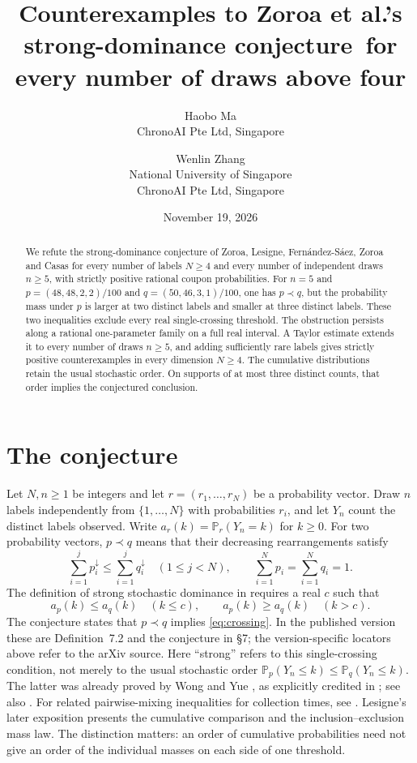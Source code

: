 \documentclass[11pt,a4paper]{article}
\title{Counterexamples to Zoroa et al.'s strong-dominance conjecture\ for every number of draws above four}
\author{Haobo Ma\\\small ChronoAI Pte Ltd, Singapore
\and Wenlin Zhang\\\small National University of Singapore\\\small ChronoAI Pte Ltd, Singapore}
\date{November 19, 2026}
\newcommand{\Prob}{\mathbb P}
\begin{document}
\maketitle
\begin{abstract}
We refute the strong-dominance conjecture of Zoroa, Lesigne,
Fern\'andez-S\'aez, Zoroa and Casas \cite[\S8, Conjecture, p.~30,
arXiv:1608.00155v1]{zoroa} for every number of labels $N\geq4$ and every
number of independent draws $n\geq5$, with strictly positive rational
coupon probabilities. For $n=5$ and
$p=(48,48,2,2)/100$ and $q=(50,46,3,1)/100$, one has $p\prec q$, but the
probability mass under $p$ is larger at two distinct labels and smaller at
three distinct labels. These two inequalities exclude every real
single-crossing threshold. The obstruction persists along a rational
one-parameter family on a full real interval. A Taylor estimate extends it
to every number of draws $n\geq5$, and adding sufficiently rare labels
gives strictly positive counterexamples in every dimension $N\geq4$.
The cumulative distributions retain the usual stochastic order. On
supports of at most three distinct counts, that order implies the
conjectured conclusion.
\end{abstract}

\section{The conjecture}
Let $N,n\geq1$ be integers and let $r=(r_1,\ldots,r_N)$ be a probability
vector. Draw $n$ labels independently from $\{1,\ldots,N\}$ with
probabilities $r_i$, and let $Y_n$ count the distinct labels observed.
Write $a_r(k)=\Prob_r(Y_n=k)$ for $k\geq0$.
For two probability vectors, $p\prec q$ means that their decreasing
rearrangements satisfy
\[
 \sum_{i=1}^j p_i^{\downarrow}\leq\sum_{i=1}^j q_i^{\downarrow}
 \quad(1\leq j<N),\qquad
 \sum_{i=1}^N p_i=\sum_{i=1}^N q_i=1.
\]
The definition of strong stochastic dominance in
\cite[Definition~8.2, pp.~28, 30]{zoroa} requires a real $c$ such that
\begin{equation}\label{eq:crossing}
 a_p(k)\leq a_q(k)\quad(k\leq c),\qquad
 a_p(k)\geq a_q(k)\quad(k>c).
\end{equation}
The conjecture states that $p\prec q$ implies \eqref{eq:crossing}.
In the published version these are Definition~7.2 and the conjecture
in \S7; the version-specific locators above refer to the arXiv source.
Here ``strong'' refers to this single-crossing condition, not merely to
the usual stochastic order
$\Prob_p(Y_n\leq k)\leq\Prob_q(Y_n\leq k)$.
The latter was already proved by Wong and Yue
\cite[pp.~391--398]{wongyue}, as explicitly credited in
\cite[Remark~6.1, pp.~25--26]{zoroa}; see also
\cite[Corollary~6.1, p.~25]{zoroa}.
For related pairwise-mixing inequalities for collection times, see
\cite[Theorem~1]{anceaume}. Lesigne's later exposition
\cite[\S4, p.~5; \S7, Proposition~1]{lesigne} presents the cumulative
comparison and the inclusion--exclusion mass law. The distinction matters: an order of
cumulative probabilities need not give an order of the individual masses
on each side of one threshold.
\end{document}
